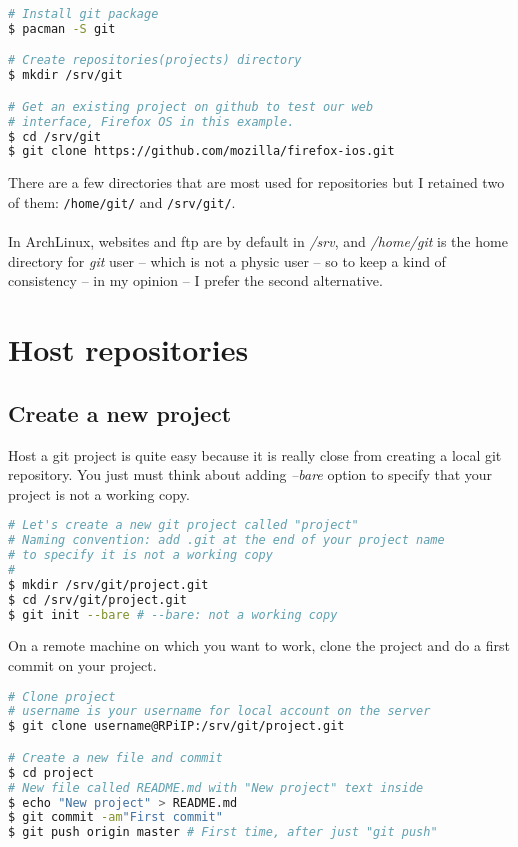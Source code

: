 \begin{lstlisting}[language=bash,caption=Install git and add projects]
# Install git package
$ pacman -S git

# Create repositories(projects) directory
$ mkdir /srv/git

# Get an existing project on github to test our web 
# interface, Firefox OS in this example.
$ cd /srv/git
$ git clone https://github.com/mozilla/firefox-ios.git
\end{lstlisting}

There are a few directories that are most used for repositories but I retained two 
of them: \texttt{/home/git/} and \texttt{/srv/git/}. 
\\\\
In ArchLinux, websites and ftp are by default in \emph{/srv}, and \emph{/home/git} 
is the home directory for \emph{git} user -- which is not a physic user -- so to 
keep a kind of consistency -- in my opinion -- I prefer the second alternative. 

\section{Host repositories}
\subsection{Create a new project}
Host a git project is quite easy because it is really close from creating a local 
git repository. You just must think about adding \emph{--bare} option to specify 
that your project is not a working copy. 
\begin{lstlisting}[language=bash,caption=Create a repository on your server]
# Let's create a new git project called "project"
# Naming convention: add .git at the end of your project name
# to specify it is not a working copy
#
$ mkdir /srv/git/project.git
$ cd /srv/git/project.git
$ git init --bare # --bare: not a working copy
\end{lstlisting}

On a remote machine on which you want to work, clone the project and do a first 
commit on your project.
\begin{lstlisting}[language=bash,caption=Clone repository to work]
# Clone project
# username is your username for local account on the server 
$ git clone username@RPiIP:/srv/git/project.git

# Create a new file and commit
$ cd project
# New file called README.md with "New project" text inside
$ echo "New project" > README.md 
$ git commit -am"First commit"
$ git push origin master # First time, after just "git push"
\end{lstlisting}

